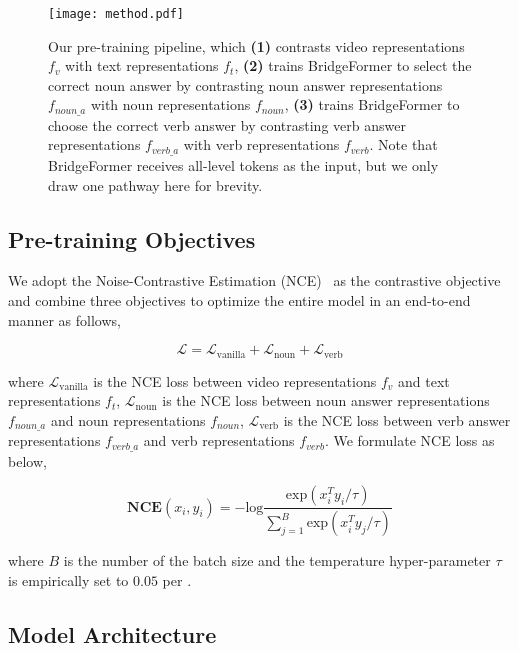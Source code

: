 \documentclass[10pt,twocolumn,letterpaper]{article}
\begin{document}
\begin{figure}
	\centering
	\texttt{[image: method.pdf]}
	\caption{Our pre-training pipeline, which \textbf{(1)} contrasts video representations $f_v$ with text representations $f_t$, \textbf{(2)} trains BridgeFormer to select the correct noun answer by contrasting noun answer representations $f_{noun\_a}$ with noun representations $f_{noun}$, \textbf{(3)} trains BridgeFormer to choose the correct verb answer by contrasting verb answer representations $f_{verb\_a}$ with verb representations $f_{verb}$. Note that BridgeFormer receives all-level tokens as the input, but we only draw one pathway here for brevity.}
	\vspace{-4mm}	
	\label{fig:method}
\end{figure}


\subsection{Pre-training Objectives}\label{sec:strategy}
 We adopt the Noise-Contrastive Estimation (NCE)~\cite{contrastive1,contrastive2} as the contrastive objective and combine three objectives to optimize the entire model in an end-to-end manner as follows,
\begin{small}
\begin{equation}
	\mathcal{L} = \mathcal{L}_\text{vanilla} + \mathcal{L}_\text{noun} + \mathcal{L}_\text{verb}
\end{equation}
\end{small}
where $\mathcal{L}_\text{vanilla}$ is the NCE loss between video representations $f_v$ and text representations $f_t$, $\mathcal{L}_\text{noun}$ is the NCE loss between noun answer representations $f_{noun\_a}$ and noun representations $f_{noun}$, $\mathcal{L}_\text{verb}$ is the NCE loss between verb answer representations $f_{verb\_a}$ and verb representations $f_{verb}$. We formulate NCE loss as below,
	\begin{small}
		\begin{equation}
			\textbf{NCE}(x_i,y_i)= - \text{log}\frac{\text{exp}(x_i^Ty_i/\tau)}{\sum_{j=1}^B\text{exp}(x_i^Ty_j/\tau)} 
		\end{equation}
	\end{small}
where $B$ is the number of the batch size and the temperature hyper-parameter $\tau$ is empirically set to $0.05$ per \cite{frozen}.


\subsection{Model Architecture}\label{sec:architecture}
\end{document}

